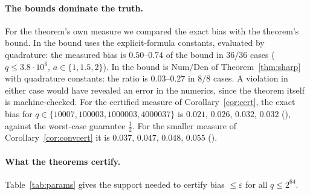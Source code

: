 \paragraph{The bounds dominate the truth.}
For the theorem's own measure we compared the exact bias with the theorem's bound. In
 the bound uses the explicit-formula constants, evaluated by quadrature: the
measured bias is $0.50$--$0.74$ of the bound in $36/36$ cases ($q\le3.8\cdot10^6$, $a\in\{1,1.5,2\}$). In
 the bound is $\mathrm{Num}/\mathrm{Den}$ of Theorem~\ref{thm:sharp} with quadrature
constants: the ratio is $0.03$--$0.27$ in $8/8$ cases. A violation in either case would have revealed an
error in the numerics, since the theorem itself is machine-checked. For the certified measure of
Corollary~\ref{cor:cert}, the exact bias for $q\in\{10007,100003,1000003,4000037\}$ is
$0.021$, $0.026$, $0.032$, $0.032$ (), against the worst-case guarantee $\frac12$. For the
smaller measure of Corollary~\ref{cor:convcert} it is $0.037$, $0.047$, $0.048$, $0.055$ ().

\paragraph{What the theorems certify.}
Table~\ref{tab:params} gives the support needed to certify bias $\le\varepsilon$ for all $q\le2^{64}$.

